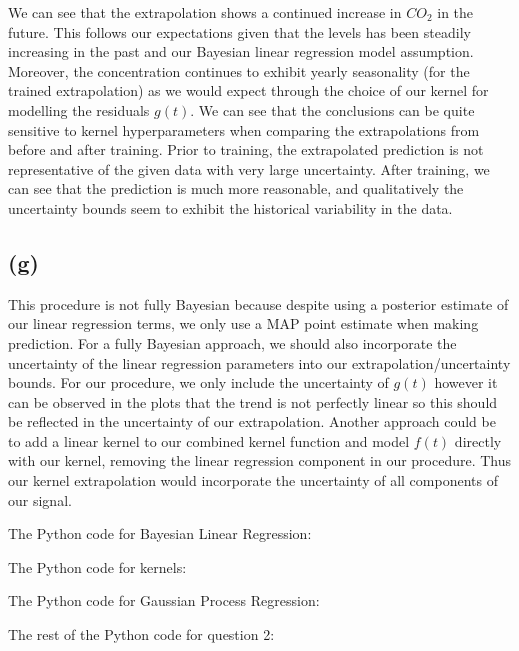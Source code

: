 \documentclass[12pt]{article}
\begin{document}
We can see that the extrapolation shows a continued increase in $CO_2$ in the future.
This follows our expectations given that the levels has been steadily increasing in the past and our Bayesian linear regression model assumption.
Moreover, the concentration continues to exhibit yearly seasonality (for the trained extrapolation) as we would expect through the choice of our kernel for modelling the residuals $g(t)$.
We can see that the conclusions can be quite sensitive to kernel hyperparameters when comparing the extrapolations from before and after training.
Prior to training, the extrapolated prediction is not representative of the given data with very large uncertainty.
After training, we can see that the prediction is much more reasonable, and qualitatively the uncertainty bounds seem to exhibit the historical variability in the data.


\subsection*{(g)}

This procedure is not fully Bayesian because despite using a posterior estimate of our linear regression terms, we only use a MAP point estimate when making prediction.
For a fully Bayesian approach, we should also incorporate the uncertainty of the linear regression parameters into our extrapolation/uncertainty bounds.
For our procedure, we only include the uncertainty of $g(t)$ however it can be observed in the plots that the trend is not perfectly linear so this should be reflected in the uncertainty of our extrapolation.
Another approach could be to add a linear kernel to our combined kernel function and model $f(t)$ directly with our kernel, removing the linear regression component in our procedure.
Thus our kernel extrapolation would incorporate the uncertainty of all components of our signal.

\newpage
The Python code for Bayesian Linear Regression:


\newpage
The Python code for kernels:


\newpage
The Python code for Gaussian Process Regression:


\newpage
The rest of the Python code for question 2:

\end{document}
